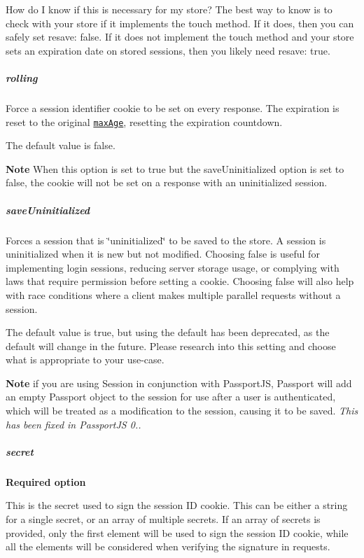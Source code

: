 How do I know if this is necessary for my store? The best way to know is to check with your store if it implements the {\ttfamily touch} method. If it does, then you can safely set {\ttfamily resave\+: false}. If it does not implement the {\ttfamily touch} method and your store sets an expiration date on stored sessions, then you likely need {\ttfamily resave\+: true}.

\subparagraph*{rolling}

Force a session identifier cookie to be set on every response. The expiration is reset to the original \href{#cookiemaxage}{\tt {\ttfamily max\+Age}}, resetting the expiration countdown.

The default value is {\ttfamily false}.

{\bfseries Note} When this option is set to {\ttfamily true} but the {\ttfamily save\+Uninitialized} option is set to {\ttfamily false}, the cookie will not be set on a response with an uninitialized session.

\subparagraph*{save\+Uninitialized}

Forces a session that is \char`\"{}uninitialized\char`\"{} to be saved to the store. A session is uninitialized when it is new but not modified. Choosing {\ttfamily false} is useful for implementing login sessions, reducing server storage usage, or complying with laws that require permission before setting a cookie. Choosing {\ttfamily false} will also help with race conditions where a client makes multiple parallel requests without a session.

The default value is {\ttfamily true}, but using the default has been deprecated, as the default will change in the future. Please research into this setting and choose what is appropriate to your use-\/case.

{\bfseries Note} if you are using Session in conjunction with Passport\+JS, Passport will add an empty Passport object to the session for use after a user is authenticated, which will be treated as a modification to the session, causing it to be saved. {\itshape This has been fixed in Passport\+JS 0..}

\subparagraph*{secret}

{\bfseries Required option}

This is the secret used to sign the session ID cookie. This can be either a string for a single secret, or an array of multiple secrets. If an array of secrets is provided, only the first element will be used to sign the session ID cookie, while all the elements will be considered when verifying the signature in requests.

